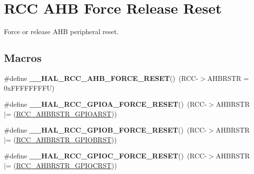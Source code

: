 \hypertarget{group___r_c_c___a_h_b___force___release___reset}{}\section{R\+CC A\+HB Force Release Reset}
\label{group___r_c_c___a_h_b___force___release___reset}


Force or release A\+HB peripheral reset.  


\subsection*{Macros}
\begin{DoxyCompactItemize}
\item 
\mbox{\label{group___r_c_c___a_h_b___force___release___reset_ga70ac7ee64a7f1911e3c89d54efb13695}} 
\#define {\bfseries \+\_\+\+\_\+\+H\+A\+L\+\_\+\+R\+C\+C\+\_\+\+A\+H\+B\+\_\+\+F\+O\+R\+C\+E\+\_\+\+R\+E\+S\+ET}()~(R\+CC-\/$>$A\+H\+B\+R\+S\+TR = 0x\+F\+F\+F\+F\+F\+F\+F\+F\+U)
\item 
\mbox{\label{group___r_c_c___a_h_b___force___release___reset_gab329bd497cccffd979bcca9fd42bbc79}} 
\#define {\bfseries \+\_\+\+\_\+\+H\+A\+L\+\_\+\+R\+C\+C\+\_\+\+G\+P\+I\+O\+A\+\_\+\+F\+O\+R\+C\+E\+\_\+\+R\+E\+S\+ET}()~(R\+CC-\/$>$A\+H\+B\+R\+S\+TR $\vert$= (\hyperlink{group___peripheral___registers___bits___definition_ga327f966b6e8dc82dc0ac950539ce0407}{R\+C\+C\+\_\+\+A\+H\+B\+R\+S\+T\+R\+\_\+\+G\+P\+I\+O\+A\+R\+ST}))
\item 
\mbox{\label{group___r_c_c___a_h_b___force___release___reset_ga3b89be9638638ffce3ebd4f08a3b64cf}} 
\#define {\bfseries \+\_\+\+\_\+\+H\+A\+L\+\_\+\+R\+C\+C\+\_\+\+G\+P\+I\+O\+B\+\_\+\+F\+O\+R\+C\+E\+\_\+\+R\+E\+S\+ET}()~(R\+CC-\/$>$A\+H\+B\+R\+S\+TR $\vert$= (\hyperlink{group___peripheral___registers___bits___definition_gab07dc17b79c908bdbf9cf196947d0035}{R\+C\+C\+\_\+\+A\+H\+B\+R\+S\+T\+R\+\_\+\+G\+P\+I\+O\+B\+R\+ST}))
\item 
\mbox{\label{group___r_c_c___a_h_b___force___release___reset_ga6e6a20fa8e0d7b3ebfdce26f6b1a1ed0}} 
\#define {\bfseries \+\_\+\+\_\+\+H\+A\+L\+\_\+\+R\+C\+C\+\_\+\+G\+P\+I\+O\+C\+\_\+\+F\+O\+R\+C\+E\+\_\+\+R\+E\+S\+ET}()~(R\+CC-\/$>$A\+H\+B\+R\+S\+TR $\vert$= (\hyperlink{group___peripheral___registers___bits___definition_ga5b837c7b81c1a4b8f986c23b7c5b5afa}{R\+C\+C\+\_\+\+A\+H\+B\+R\+S\+T\+R\+\_\+\+G\+P\+I\+O\+C\+R\+ST}))

\end{DoxyCompactItemize}
